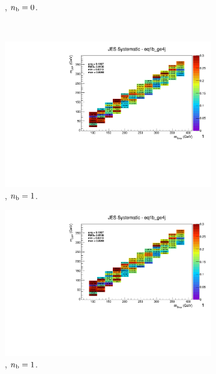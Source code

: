 \begin{figure}[ht!]
\begin{subfigure}[b]{0.32\textwidth}
    \caption{\njhigh, $n_{\text{b}} = 0$.}
    \label{fig:sms-jes-tdegen-ge4j-0b}
  \end{subfigure}\\
  \begin{subfigure}[b]{0.32\textwidth}
    \includegraphics[width=\textwidth, page=12]{Figs/sms/t2degen/v19/systs/T2_4body_JES_eq1b_ge4j.pdf}
    \caption{\njhigh, $n_{\text{b}} = 1$.}
  \end{subfigure}
  \begin{subfigure}[b]{0.32\textwidth}
    \includegraphics[width=\textwidth, page=8]{Figs/sms/t2degen/v19/systs/T2_4body_JES_eq1b_ge4j.pdf}
    \caption{\njhigh, $n_{\text{b}} = 1$.}
  \end{subfigure}
  \begin{subfigure}[b]{0.32\textwidth}

\end{subfigure}
\end{figure}
